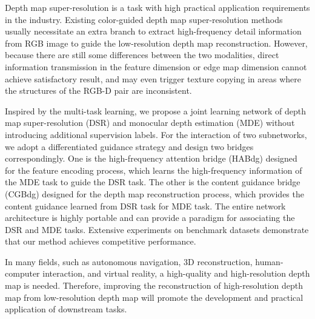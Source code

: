 \begin{englishabstract}
	\noindent{}Depth map super-resolution is a task with high practical application requirements in the industry. Existing color-guided depth map super-resolution methods usually necessitate an extra branch to extract high-frequency detail information from RGB image to guide the low-resolution depth map reconstruction. However, because there are still some differences between the two modalities, direct information transmission in the feature dimension or edge map dimension cannot achieve satisfactory result, and may even trigger texture copying in areas where the structures of the RGB-D pair are inconsistent.
	
Inspired by the multi-task learning, we propose a joint learning network of depth map super-resolution (DSR) and monocular depth estimation (MDE) without introducing additional supervision labels. For the interaction of two subnetworks, we adopt a differentiated guidance strategy and design two bridges correspondingly. One is the high-frequency attention bridge (HABdg) designed for the feature encoding process, which learns the high-frequency information of the MDE task to guide the DSR task. The other is the content guidance bridge (CGBdg) designed for the depth map reconstruction process, which provides the content guidance learned from DSR task for MDE task. The entire network architecture is highly portable and can provide a paradigm for associating the DSR and MDE tasks. Extensive experiments on benchmark datasets demonstrate that our method achieves competitive performance.

In many fields, such as autonomous navigation, 3D reconstruction, human-computer interaction, and virtual reality, a high-quality and high-resolution depth map is needed. Therefore, improving the reconstruction of high-resolution depth map from low-resolution depth map will promote the development and practical application of downstream tasks.
	\newline		
	\newline
	\noindent {}
\end{englishabstract}